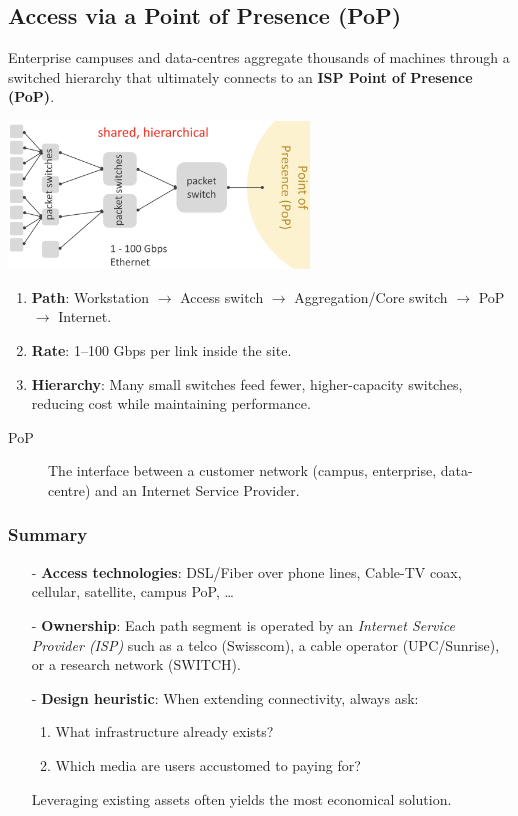 \documentclass[../../compsys.tex]{subfiles}
\begin{document}
\subsection{Access via a Point of Presence (PoP)}
Enterprise campuses and data-centres aggregate thousands of machines
through a switched hierarchy that ultimately connects to an
\textbf{ISP Point of Presence (PoP)}.
\begin{center}
  \includegraphics[width=0.6\textwidth]{images/pop.png}
\end{center}

\begin{enumerate}
  \item \textbf{Path}: Workstation $\rightarrow$ Access switch
        $\rightarrow$ Aggregation/Core switch $\rightarrow$ PoP
        $\rightarrow$ Internet.
  \item \textbf{Rate}: 1--100 Gbps per link inside the site.
  \item \textbf{Hierarchy}: Many small switches feed fewer, higher-capacity
        switches, reducing cost while maintaining performance.
\end{enumerate}

\begin{description}
  \item[PoP] The interface between a customer network (campus,
        enterprise, data-centre) and an Internet Service Provider.
\end{description}


\subsubsection{Summary}\label{sssec:summary}
\begin{itemize}
  \item[-] \textbf{Access technologies}: DSL/Fiber over phone lines,
        Cable-TV coax, cellular, satellite, campus PoP, \dots
  \item[-] \textbf{Ownership}: Each path segment is operated by an
        \emph{Internet Service Provider (ISP)} such as a telco
        (Swisscom), a cable operator (UPC/Sunrise), or a research
        network (SWITCH).
  \item[-] \textbf{Design heuristic}: When extending connectivity,
        always ask:
        \begin{enumerate}
          \item What infrastructure already exists?
          \item Which media are users accustomed to paying for?
        \end{enumerate}
        Leveraging existing assets often yields the most economical
        solution.
\end{itemize}
\newpage
\end{document}
